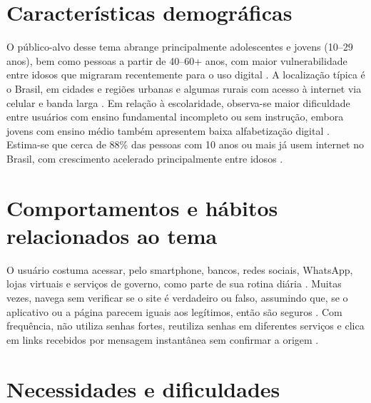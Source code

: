 \documentclass[
  12pt,
  a4paper,
  oneside,
  brazil
]{abntex2}
\begin{document}
\pretextual
\maketitle

\textual

\section{Características demográficas}

O público-alvo desse tema abrange principalmente adolescentes e jovens (10--29 anos), bem como
pessoas a partir de 40--60+ anos, com maior vulnerabilidade entre idosos que migraram
recentemente para o uso digital \cite{portalenvelhecimento2025}. A localização típica é o
Brasil, em cidades e regiões urbanas e algumas rurais com acesso à internet via celular e banda
larga \cite{ibge_tic2023}. Em relação à escolaridade, observa-se maior dificuldade entre
usuários com ensino fundamental incompleto ou sem instrução, embora jovens com ensino médio
também apresentem baixa alfabetização digital \cite{ibge_pnad_educ2023, educafcc2022}.
Estima-se que cerca de 88\% das pessoas com 10 anos ou mais já usem internet no Brasil, com
crescimento acelerado principalmente entre idosos \cite{ibge_tic2023}.

\section{Comportamentos e hábitos relacionados ao tema}

O usuário costuma acessar, pelo smartphone, bancos, redes sociais, WhatsApp, lojas virtuais e
serviços de governo, como parte de sua rotina diária \cite{bcb_rig2024, ibge_tic2023}. Muitas
vezes, navega sem verificar se o site é verdadeiro ou falso, assumindo que, se o aplicativo ou
a página parecem iguais aos legítimos, então são seguros \cite{certbr2024}. Com frequência,
não utiliza senhas fortes, reutiliza senhas em diferentes serviços e clica em links recebidos
por mensagem instantânea sem confirmar a origem \cite{bcb_rig2024}.

\section{Necessidades e dificuldades}
\end{document}

